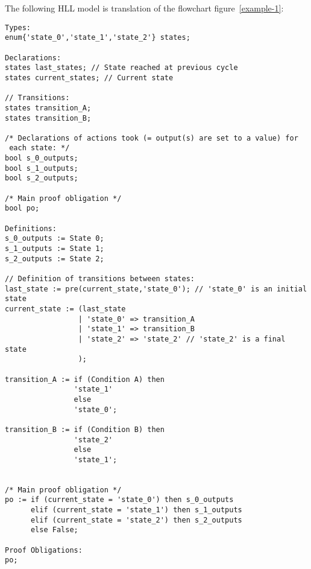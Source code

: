 The following HLL model is translation of the flowchart
figure~\ref{example-1}: 
{\footnotesize
\begin{verbatim}
Types:
enum{'state_0','state_1','state_2'} states;

Declarations:
states last_states; // State reached at previous cycle
states current_states; // Current state

// Transitions:
states transition_A;
states transition_B;

/* Declarations of actions took (= output(s) are set to a value) for
 each state: */
bool s_0_outputs;
bool s_1_outputs;
bool s_2_outputs;

/* Main proof obligation */
bool po;

Definitions:
s_0_outputs := State 0;
s_1_outputs := State 1;
s_2_outputs := State 2;

// Definition of transitions between states:
last_state := pre(current_state,'state_0'); // 'state_0' is an initial state
current_state := (last_state
                 | 'state_0' => transition_A
                 | 'state_1' => transition_B
                 | 'state_2' => 'state_2' // 'state_2' is a final state
                 );

transition_A := if (Condition A) then
                'state_1'
                else
                'state_0';

transition_B := if (Condition B) then
                'state_2'
                else
                'state_1';


/* Main proof obligation */
po := if (current_state = 'state_0') then s_0_outputs
      elif (current_state = 'state_1') then s_1_outputs
      elif (current_state = 'state_2') then s_2_outputs
      else False;

Proof Obligations:
po;
\end{verbatim}
}


